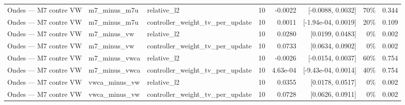 \begin{tabular}{llllrrrr}
Ondes — M7 contre VW & m7\_minus\_m7u & relative\_l2 & 10 & -0.0022 & [-0.0088, 0.0032] & 70\% & 0.344 \\
Ondes — M7 contre VW & m7\_minus\_m7u & controller\_weight\_tv\_per\_update & 10 & 0.0011 & [-1.94e-04, 0.0019] & 20\% & 0.109 \\
Ondes — M7 contre VW & m7\_minus\_vw & relative\_l2 & 10 & 0.0280 & [0.0199, 0.0483] & 0\% & 0.002 \\
Ondes — M7 contre VW & m7\_minus\_vw & controller\_weight\_tv\_per\_update & 10 & 0.0733 & [0.0634, 0.0902] & 0\% & 0.002 \\
Ondes — M7 contre VW & m7\_minus\_vwca & relative\_l2 & 10 & -0.0026 & [-0.0154, 0.0037] & 60\% & 0.754 \\
Ondes — M7 contre VW & m7\_minus\_vwca & controller\_weight\_tv\_per\_update & 10 & 4.63e-04 & [-9.43e-04, 0.0014] & 40\% & 0.754 \\
Ondes — M7 contre VW & vwca\_minus\_vw & relative\_l2 & 10 & 0.0355 & [0.0178, 0.0517] & 0\% & 0.002 \\
Ondes — M7 contre VW & vwca\_minus\_vw & controller\_weight\_tv\_per\_update & 10 & 0.0728 & [0.0626, 0.0911] & 0\% & 0.002 \\
\bottomrule
\end{tabular}
